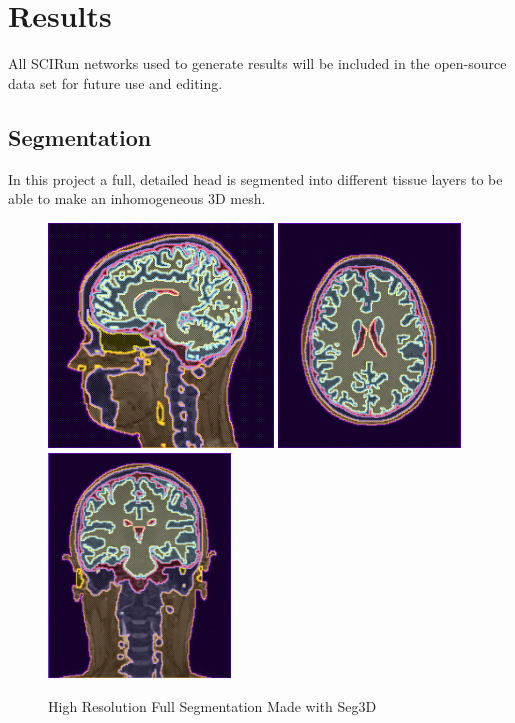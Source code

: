 %

\section{Results}
\label{sec:results}

All SCIRun networks used to generate results will be included in the open-source data set for future use and editing.

\subsection{Segmentation}

In this project a full, detailed head is segmented into different tissue layers to be able to make an inhomogeneous 3D mesh. 

\begin{figure}[H]
\begin{center}
\includegraphics[height=2.35in]{Figures/seg_1}
\includegraphics[height=2.35in]{Figures/seg_2}
\includegraphics[height=2.35in]{Figures/seg_3}
\caption{High Resolution Full Segmentation Made with Seg3D}
\label{fig:fullseg}
\end{center}
\end{figure}

